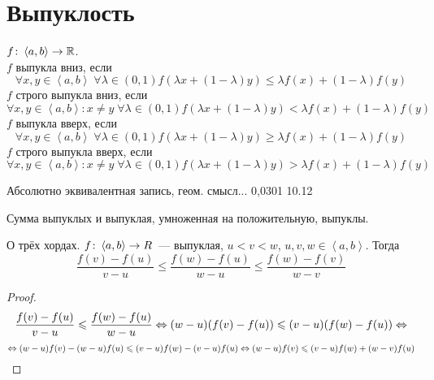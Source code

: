 ﻿\section{Выпуклость}

\begin{Def}
$f\colon \left<a, b\right> \rightarrow \mathbb{R}$. \\
$f$ выпукла вниз, если 
$$\forall x, y \in \left<a, b\right>\; \forall \lambda \in (0, 1) f(\lambda x + (1-\lambda)y) \leqslant \lambda f(x) + (1-\lambda) f(y)$$
$f$ строго выпукла вниз, если 
$$\forall x, y \in \left<a, b\right>\colon x \ne y\; \forall \lambda \in (0, 1) f(\lambda x + (1-\lambda)y) < \lambda f(x) + (1-\lambda) f(y)$$
$f$ выпукла вверх, если 
$$\forall x, y \in \left<a, b\right>\; \forall \lambda \in (0, 1) f(\lambda x + (1-\lambda)y) \geqslant \lambda f(x) + (1-\lambda) f(y)$$
$f$ строго выпукла вверх, если 
$$\forall x, y \in \left<a, b\right>\colon x \ne y\; \forall \lambda \in (0, 1) f(\lambda x + (1-\lambda)y) > \lambda f(x) + (1-\lambda) f(y)$$
\end{Def}
Абсолютно эквивалентная запись, геом. смысл...	0,0301
10.12	

\begin{Rem}
Сумма выпуклых и выпуклая, умноженная на положительную, выпуклы.
\end{Rem}

\begin{lemma}
О трёх хордах. $f\colon \left<a, b\right> \rightarrow R$~--- выпуклая, $u < v < w$, $u,v,w \in \left<a, b\right>$. Тогда
$$\frac{f(v) - f(u)}{v - u} \leqslant \frac{f(w) - f(u)}{w-u} \leqslant \frac{f(w) - f(v)}{w-v}$$
\end{lemma}
\begin{proof}
$$\frac{f(v) - f(u)}{v - u} \leqslant \frac{f(w) - f(u)}{w-u} \Leftrightarrow (w-u)(f(v) - f(u)) \leqslant (v-u)(f(w) - f(u)) \Leftrightarrow$$
$$\Leftrightarrow (w-u)f(v) - (w-u)f(u) \leqslant (v-u)f(w) - (v-u)f(u) \Leftrightarrow (w-u)f(v) \leqslant (v-u)f(w) + (w-v)f(u)$$
\end{proof}
